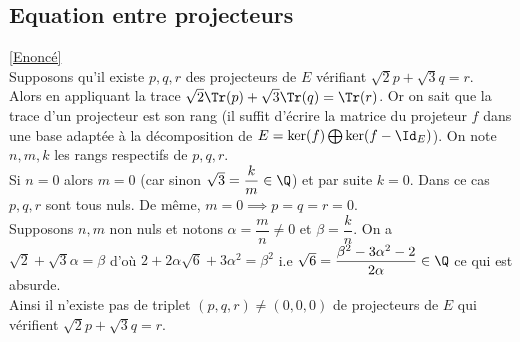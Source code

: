 \documentclass[8pt]{book}
\begin{document}
	\subsection{Equation entre projecteurs}
	\label{Equation entre projecteurs corrigé}
	\textcolor{blue}{\hyperref[Equation entre projecteurs]{[Enoncé]}}\\
	Supposons qu'il existe $p,q,r$ des projecteurs de $E$ vérifiant $\sqrt 2p+\sqrt 3q=r$.\\
	Alors en appliquant la trace $\sqrt 2\Tr(p)+\sqrt 3\Tr(q)=\Tr(r)$. Or on sait que la trace d'un projecteur est son rang (il suffit d'écrire la matrice du projeteur $f$ dans une base adaptée à la décomposition de $E=\ker(f)\bigoplus\ker(f-\Id_E)$). On note $n,m,k$ les rangs respectifs de $p,q,r$.\\
	Si $n=0$ alors $m=0$ (car sinon $\sqrt 3=\dfrac{k}{m}\in \Q$) et par suite $k=0$. Dans ce cas $p,q,r$ sont tous nuls. De même, $m=0\implies p=q=r=0$.\\
	Supposons $n,m$ non nuls et notons $\alpha=\dfrac{m}{n}\ne 0$ et $\beta=\dfrac{k}{n}$. On a\\
	$\sqrt 2+\sqrt 3\alpha=\beta$ d'où $2+2\alpha\sqrt 6+3\alpha^2=\beta^2$ i.e $\sqrt 6=\dfrac{\beta^2-3\alpha^2-2}{2\alpha}\in \Q$ ce qui est absurde.\\
	Ainsi il n'existe pas de triplet $(p,q,r)\ne (0,0,0)$ de projecteurs de $E$ qui vérifient $\sqrt 2p+\sqrt 3q=r$.
	
\end{document}
